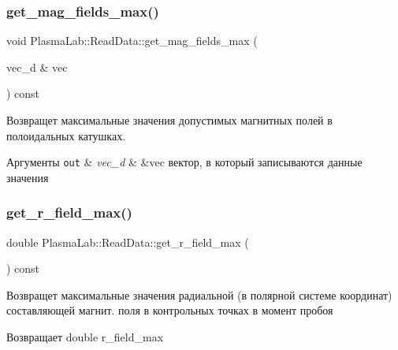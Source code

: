 \subsubsection{\texorpdfstring{get\+\_\+mag\+\_\+fields\+\_\+max()}{get\_mag\_fields\_max()}}
{\footnotesize\ttfamily void Plasma\+Lab\+::\+Read\+Data\+::get\+\_\+mag\+\_\+fields\+\_\+max (\begin{DoxyParamCaption}\item[{vec\+\_\+d \&}]{vec }\end{DoxyParamCaption}) const\hspace{0.3cm}{\ttfamily [inline]}}

Возвращет максимальные значения допустимых магнитных полей в полоидальных катушках. 
\begin{DoxyParams}[1]{Аргументы}
\mbox{\tt out}  & {\em vec\+\_\+d} & \&vec вектор, в который записываются данные значения \\
\hline
\end{DoxyParams}
\mbox{\label{class_plasma_lab_1_1_read_data_a2594acab4c4492fcfd8aa45b9836fe44}} 
\subsubsection{\texorpdfstring{get\+\_\+r\+\_\+field\+\_\+max()}{get\_r\_field\_max()}}
{\footnotesize\ttfamily double Plasma\+Lab\+::\+Read\+Data\+::get\+\_\+r\+\_\+field\+\_\+max (\begin{DoxyParamCaption}{ }\end{DoxyParamCaption}) const\hspace{0.3cm}{\ttfamily [inline]}}

Возвращет максимальные значения радиальной (в полярной системе координат) составляющей магнит. поля в контрольных точках в момент пробоя \begin{DoxyReturn}{Возвращает}
double r\+\_\+field\+\_\+max 
\end{DoxyReturn}
\mbox{\label{class_plasma_lab_1_1_read_data_a17e02dac99573cf6cd3cce1d5d381a0c}} 
